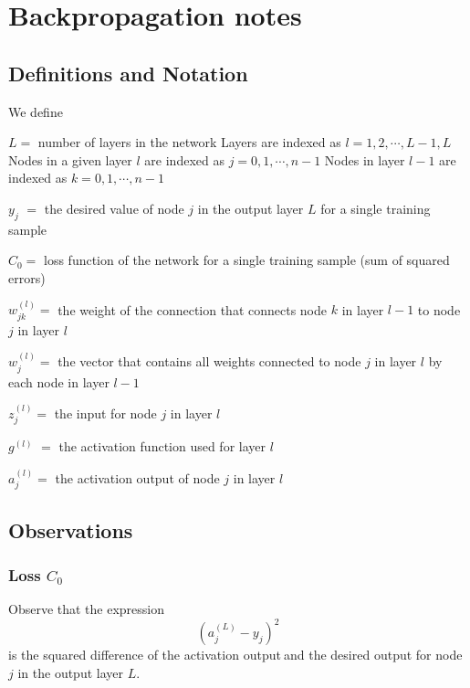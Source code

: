 \documentclass{article}
\begin{document}
\section{\protect\vspace{1pt}Backpropagation notes}

\subsection{\protect\vspace{1pt}Definitions and Notation}

We define

$L=$ number of layers in the network\newline
Layers are indexed as $l=1,2,\cdots ,L-1,L$\newline
Nodes in a given layer $l$ are indexed as $j=0,1,\cdots ,n-1$\newline
Nodes in layer $l-1$ are indexed as $k=0,1,\cdots ,n-1$\newline

$y_{j}$ $=$ the desired value of node $j$ in the output layer $L$ for a
single training sample

$C_{0}=$ loss function of the network for a single training sample (sum of
squared errors)

$w_{jk}^{(l)}=$ the weight of the connection that connects node $k$ in layer 
$l-1$ to node $j$ in layer $l$

$w_{j}^{\left( l\right) }=$ the vector that contains all weights connected
to node $j$ in layer $l$ by each node in layer $l-1$

$z_{j}^{(l)}=$ the input for node $j$ in layer $l$

$g^{\left( l\right) }$ $=$ the activation function used for layer $l$

$a_{j}^{(l)}=$ the activation output of node $j$ in layer $l$\vspace{1pt}

\subsection{Observations}

\subsubsection{Loss $C_{0}$}

Observe that the expression 
\[
\left( a_{j}^{(L)}-y_{j}\right) ^{2} 
\]%
is the squared difference of the activation output$\ $and the desired output
for node $j$ in the output layer $L$.
\end{document}
